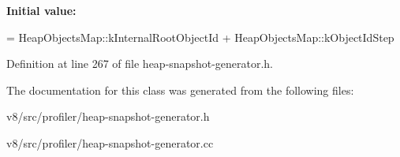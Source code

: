 {\bfseries Initial value\+:}
\begin{DoxyCode}
=
    HeapObjectsMap::kInternalRootObjectId + HeapObjectsMap::kObjectIdStep
\end{DoxyCode}


Definition at line 267 of file heap-\/snapshot-\/generator.\+h.



The documentation for this class was generated from the following files\+:\begin{DoxyCompactItemize}
\item 
v8/src/profiler/heap-\/snapshot-\/generator.\+h\item 
v8/src/profiler/heap-\/snapshot-\/generator.\+cc\end{DoxyCompactItemize}
